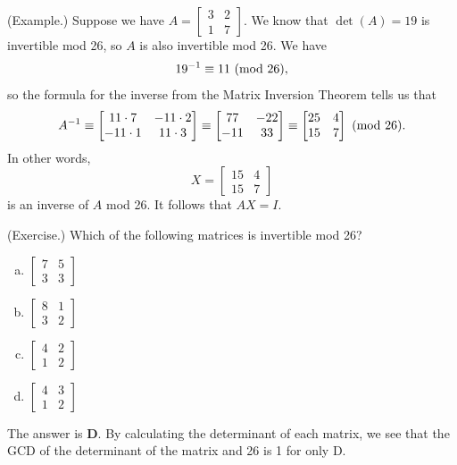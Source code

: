 \documentclass[letterpaper]{article}
\newcommand{\0}{\mathbf{0}}
\begin{document}
\begin{mdframed}
    (Example.) Suppose we have $A = \begin{bmatrix}
        3 & 2 \\ 1 & 7
    \end{bmatrix}$. We know that $\det(A) = 19$ is invertible mod 26, so $A$ is also invertible mod 26. We have \[19^{-1} \equiv 11 \ (\mathrm{mod}\ 26),\] so the formula for the inverse from the Matrix Inversion Theorem tells us that \[A^{-1} \equiv \begin{bmatrix}
        11 \cdot 7 & -11 \cdot 2 \\ -11 \cdot 1 & 11 \cdot 3 
    \end{bmatrix} \equiv \begin{bmatrix}
        77 & -22 \\ -11 & 33
    \end{bmatrix} \equiv \begin{bmatrix}
        25 & 4 \\ 15 & 7
    \end{bmatrix} \ (\mathrm{mod}\ 26).\] In other words, \[X = \begin{bmatrix}
        15 & 4 \\ 15 & 7
    \end{bmatrix}\] is an inverse of $A$ mod 26. It follows that $AX = I$. 
\end{mdframed}

\begin{mdframed}
    (Exercise.) Which of the following matrices is invertible mod 26? 
    \begin{enumerate}[(a)]
        \item $\begin{bmatrix}
            7 & 5 \\ 3 & 3 
        \end{bmatrix}$
        \item $\begin{bmatrix}
            8 & 1 \\ 3 & 2 
        \end{bmatrix}$
        \item $\begin{bmatrix}
            4 & 2 \\ 1 & 2 
        \end{bmatrix}$
        \item $\begin{bmatrix}
            4 & 3 \\ 1 & 2
        \end{bmatrix}$
    \end{enumerate}

    \begin{mdframed}
        The answer is \textbf{D}. By calculating the determinant of each matrix, we see that the GCD of the determinant of the matrix and 26 is 1 for only D. 
    \end{mdframed}
\end{mdframed}
\end{document}
